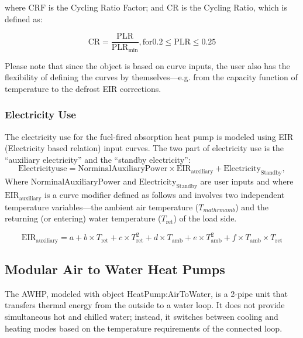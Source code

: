 where $\mathrm{CRF}$ is the Cycling Ratio Factor; and $\mathrm{CR}$ is the Cycling Ratio, which is defined as: 

\begin{equation}
\mathrm{CR} = \frac{\mathrm{PLR}}{\mathrm{PLR}_{\mathrm{min}}}, \mathrm{for} 0.2 \leq \mathrm{PLR} \leq 0.25
\end{equation}

Please note that since the object is based on curve inputs, the user also has the flexibility of defining the curves by themselves---e.g. from the capacity function of temperature to the defrost EIR corrections. 

\subsubsection{Electricity Use}

The electricity use for the fuel-fired absorption heat pump is modeled using EIR (Electricity based relation) input curves. The two part of electricity use is the ``auxiliary electricity'' and the ``standby electricity'':
\begin{equation}
\mathrm{Electricity use} = \mathrm{Norminal Auxiliary Power} \times \mathrm{EIR}_{\mathrm{auxiliary}} + \mathrm{Electricity}_{\mathrm{Standby}},
\end{equation}
Where $\mathrm{Norminal Auxiliary Power}$ and $\mathrm{Electricity}_{\mathrm{Standby}}$ are user inputs and where $\mathrm{EIR}_{\mathrm{auxiliary}}$ is a curve modifier defined as follows and involves two independent temperature variables---the ambient air temperature ($T_{mathrm{amb}}$) and the returning (or entering) water temperature ($T_{\mathrm{ret}}$) of the load side.

\begin{equation}
\mathrm{EIR}_{\mathrm{auxiliary}} = a + b \times T_{\mathrm{ret}} + c \times T_{\mathrm{ret}}^{2} + d \times T_{\mathrm{amb}} + e \times T_{\mathrm{amb}}^{2} + f \times T_{\mathrm{amb}} \times T_{\mathrm{ret}}
\end{equation}

\subsection{Modular Air to Water Heat Pumps}\label{modular-air-to-water-heat-pumps}

The AWHP, modeled with object HeatPump:AirToWater, is a 2-pipe unit that
transfers thermal energy from the outside to a water loop. It does not provide
simultaneous hot and chilled water; instead, it switches between cooling and
heating modes based on the temperature requirements of the connected loop.

